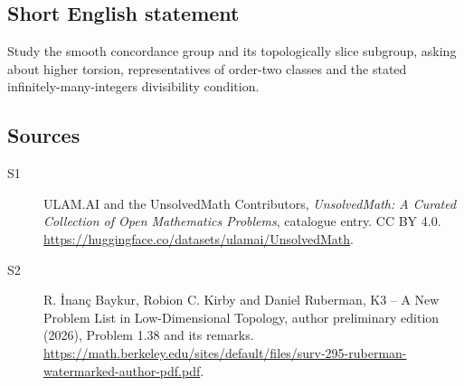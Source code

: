 \documentclass[11pt]{article}
\begin{document}
\subsection{Short English statement}
Study the smooth concordance group and its topologically slice subgroup, asking about higher torsion, representatives of order-two classes and the stated infinitely-many-integers divisibility condition.
\subsection{Sources}
\begin{description}
\item[\hypertarget{source:statement:1}{S1}] ULAM.AI and the UnsolvedMath Contributors, \emph{UnsolvedMath: A Curated Collection of Open Mathematics Problems}, catalogue entry. CC BY 4.0. \url{https://huggingface.co/datasets/ulamai/UnsolvedMath}.
\item[\hypertarget{source:statement:2}{S2}] R. \.{I}nan\c{c} Baykur, Robion C. Kirby and Daniel Ruberman, K3 -- A New Problem List in Low-Dimensional Topology, author preliminary edition (2026), Problem 1.38 and its remarks. \url{https://math.berkeley.edu/sites/default/files/surv-295-ruberman-watermarked-author-pdf.pdf}.
\end{description}
\label{end:statement}
\end{document}
